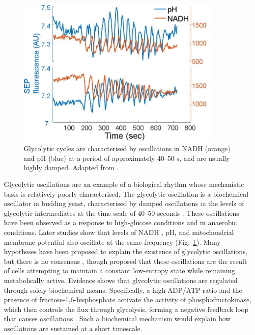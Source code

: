 \begin{figure}
  \centering
  \includegraphics[width=0.9\textwidth]{doddLiveCellImaging2017_3a_adapted}
  \caption[
    Glycolytic cycles
  ]{
    Glycolytic cycles are characterised by oscillations in NADH (orange) and pH (blue) at a period of approximately 40--50 s, and are usually highly damped.
    Adapted from \textcite{doddLiveCellImaging2017a}.}
  \label{fig:intro-glycolytic-overview}
\end{figure}

Glycolytic oscillations are an example of a biological rhythm whose mechanistic basis is relatively poorly characterised.
The glycolytic oscillation is a biochemical oscillator in budding yeast, characterised by damped  oscillations in the levels of glycolytic intermediates at the time scale of 40--50 seconds  \parencite{ghoshOscillationsGlycolyticIntermediates1964}.
These oscillations have been observed as a response to high-glucose conditions and in anaerobic conditions.
Later studies show that levels of NADH \parencite{lloydSaccharomycesCerevisiaeOscillatory2019, olsenOscillationsYeastGlycolysis2021}, pH, and mitochondrial membrane potential \parencite{doddLiveCellImaging2017a} also oscillate at the same frequency (Fig.\ \ref{fig:intro-glycolytic-overview}).
Many hypotheses have been proposed to explain the existence of glycolytic oscillations, but there is no consensus \parencite{lloydSaccharomycesCerevisiaeOscillatory2019}, though \textcite{thokeConstantLowentropyProcess2018} proposed that these oscillations are the result of cells attempting to maintain a constant low-entropy state while remaining metabolically active.
Evidence shows that glycolytic oscillations are regulated through solely biochemical means.
Specifically, a high ADP/ATP ratio and the presence of fructose-1,6-bisphosphate activate the activity of phosphofructokinase, which then controls the flux through glycolysis, forming a negative feedback loop that causes oscillations \parencite{ghoshOscillationsGlycolyticIntermediates1964, higginsChemicalMechanismOscillation1964}.
Such a biochemical mechanism would explain how oscillations are sustained at a short timescale.

